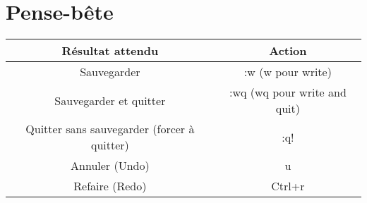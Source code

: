 \section{Pense-bête}

\bigskip
\begin{tabular}[H]{|c|c|}
  \hline
  Résultat attendu & Action\\
  \hline
  Sauvegarder & :w (w pour write)\\
  Sauvegarder et quitter & :wq (wq pour write and quit)\\
  Quitter sans sauvegarder (forcer à quitter) & :q! \\
  Annuler (Undo) & u \\
  Refaire (Redo) & Ctrl+r \\
  \hline
\end{tabular}
\bigskip

